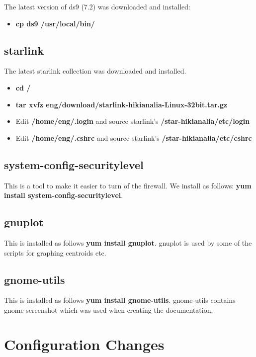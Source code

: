 \documentclass[10pt,a4paper]{article}
\begin{document}
The latest version of ds9 (7.2) \cite{bib:ds9} was downloaded and installed:

\begin{itemize}
\item {\bf cp ds9 /usr/local/bin/}
\end{itemize}

\subsection{starlink}

The latest starlink collection was downloaded \cite{bib:starlink} and installed.

\begin{itemize}
\item {\bf cd /}
\item {\bf tar xvfz \mytilde eng/download/starlink-hikianalia-Linux-32bit.tar.gz}
\item Edit {\bf /home/eng/.login} and source starlink's {\bf /star-hikianalia/etc/login}
\item Edit {\bf /home/eng/.cshrc} and source starlink's {\bf /star-hikianalia/etc/cshrc}
\end{itemize}

\subsection{system-config-securitylevel}

This is a tool to make it easier to turn of the firewall. We install as follows:
 {\bf yum install system-config-securitylevel}.

\subsection{gnuplot}

This is installed as follows {\bf yum install gnuplot}. gnuplot is used by some of the scripts
for graphing centroids etc.

\subsection{gnome-utils}

This is installed as follows {\bf yum install gnome-utils}. gnome-utils contains gnome-screenshot which was used when creating the documentation.

\section{Configuration Changes}
\end{document}
